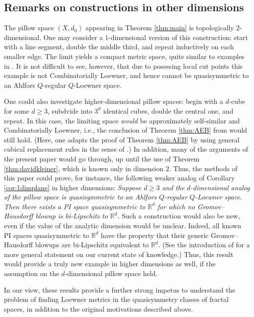 \documentclass{amsart}
\theoremstyle{plain}
\theoremstyle{definition}
\numberwithin{equation}{section}
\numberwithin{theorem}{section}
\newcommand{\RR}{\mathbb{R}}
\begin{document}
\subsection{Remarks on constructions in other dimensions}
The pillow space $(X,d_0)$ appearing in Theorem \ref{thm:main} is topologically $2$-dimensional. One may consider a $1$-dimensional version of this construction: start with a line segment, double the middle third, and repeat inductively on each smaller edge. The limit yields a compact metric space, quite similar to examples in \cite{LangPlaut, CK_PI}. It is not difficult to see, however, that due to posessing local cut points this example is not Combinatorially Loewner, and hence cannot be quasisymmetric to an Ahlfors $Q$-regular $Q$-Loewner space. 

One could also investigate higher-dimensional pillow spaces: begin with a $d$-cube for some $d\geq 3$, subdvide into $3^d$ identical cubes, double the central one, and repeat. In this case, the limiting space \emph{would} be approximately self-similar and Combinatorially Loewner, i.e., the conclusion of Theorem \ref{thm:AEB} from \cite{AEBb} would still hold. (Here, one adapts the proof of Theorem \ref{thm:AEB} by using general cubical replacement rules in the sense of \cite{AEBb}.) In addition, many of the arguments of the present paper would go through, up until the use of Theorem \ref{thm:davidkleiner}, which is known only in dimension $2$. Thus, the methods of this paper could prove, for instance, the following weaker analog of Corollary \ref{cor:1dimplane} in higher dimensions: \emph{Suppose $d\geq 3$ and the $d$-dimensional analog of the pillow space is quasisymmetric to an Ahlfors $Q$-regular $Q$-Loewner space. Then there exists a PI space quasisymmetric to $\RR^d$ for which no Gromov--Hausdorff blowup is bi-Lipschitz to $\RR^d$.} Such a construction would also be new, even if the value of the analytic dimension would be unclear. Indeed, all known PI spaces quasisymmetric to $\mathbb{R}^d$ have the property that their generic Gromov--Hausdorff blowups are bi-Lipschitz equivalent to $\mathbb{R}^d$. (See the introduction of \cite{DavidKleiner} for a more general statement on our current state of knowledge.) Thus, this result would provide a truly new example in higher dimensions as well, if the assumption on the $d$-dimensional pillow space held.

In our view, these results provide a further strong impetus to understand the problem of finding Loewner metrics in the quasisymmetry classes of fractal spaces, in addition to the original motivations described above. 
\end{document}
